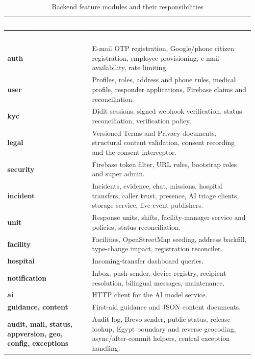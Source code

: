 {\tabfont\rowband
\begin{longtable}{@{}>{\raggedright\arraybackslash}p{}>{\raggedright\arraybackslash}p{}@{}}
\caption{Backend feature modules and their responsibilities}\label{tab:modules}\\
\rowcolor{najdanavy}\textcolor{white}{\sffamily\bfseries\small Module} & \textcolor{white}{\sffamily\bfseries\small Responsibility}\\
\endfirsthead
\rowcolor{najdanavy}\textcolor{white}{\sffamily\bfseries\small Module} & \textcolor{white}{\sffamily\bfseries\small Responsibility}\\
\endhead
\bottomrule\endlastfoot
\textbf{auth} & E-mail OTP registration, Google/\allowbreak{}phone citizen registration, employee provisioning, e-mail availability, rate limiting.\\
\textbf{user} & Profiles, roles, address and phone rules, medical profile, responder applications, Firebase claims and reconciliation.\\
\textbf{kyc} & Didit sessions, signed webhook verification, status reconciliation, verification policy.\\
\textbf{legal} & Versioned Terms and Privacy documents, structural content validation, consent recording and the consent interceptor.\\
\textbf{security} & Firebase token filter, URL rules, bootstrap roles and super admin.\\
\textbf{incident} & Incidents, evidence, chat, missions, hospital transfers, caller trust, presence, AI triage clients, storage service, live-event publishers.\\
\textbf{unit} & Response units, shifts, facility-manager service and policies, status reconciliation.\\
\textbf{facility} & Facilities, OpenStreetMap seeding, address backfill, type-change impact, registration reconciler.\\
\textbf{hospital} & Incoming-transfer dashboard queries.\\
\textbf{notification} & Inbox, push sender, device registry, recipient resolution, bilingual messages, maintenance.\\
\textbf{ai} & HTTP client for the AI model service.\\
\textbf{guidance, content} & First-aid guidance and JSON content documents.\\
\textbf{audit, mail, status, appversion, geo, config, exceptions} & Audit log, Brevo sender, public status, release lookup, Egypt boundary and reverse geocoding, async/\allowbreak{}after-commit helpers, central exception handling.\\
\end{longtable}}
